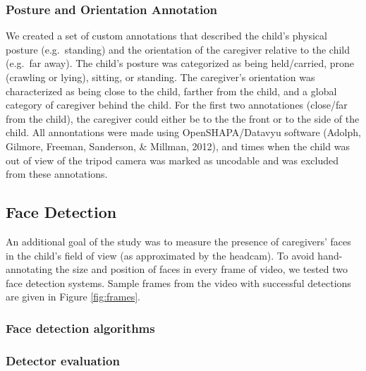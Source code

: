 \documentclass[10pt, letterpaper]{article}
\begin{document}
\subsubsection{Posture and Orientation
Annotation}\label{posture-and-orientation-annotation}

We created a set of custom annotations that described the child's
physical posture (e.g.~standing) and the orientation of the caregiver
relative to the child (e.g.~far away). The child's posture was
categorized as being held/carried, prone (crawling or lying), sitting,
or standing. The caregiver's orientation was characterized as being
close to the child, farther from the child, and a global category of
caregiver behind the child. For the first two annotationes (close/far
from the child), the caregiver could either be to the the front or to
the side of the child. All annontations were made using
OpenSHAPA/Datavyu software (Adolph, Gilmore, Freeman, Sanderson, \&
Millman, 2012), and times when the child was out of view of the tripod
camera was marked as uncodable and was excluded from these annotations.

\subsection{Face Detection}\label{face-detection}

An additional goal of the study was to measure the presence of
caregivers' faces in the child's field of view (as approximated by the
headcam). To avoid hand-annotating the size and position of faces in
every frame of video, we tested two face detection systems. Sample
frames from the video with successful detections are given in Figure
\ref{fig:frames}.

\subsubsection{Face detection
algorithms}\label{face-detection-algorithms}

\subsubsection{Detector evaluation}\label{detector-evaluation}
\end{document}
